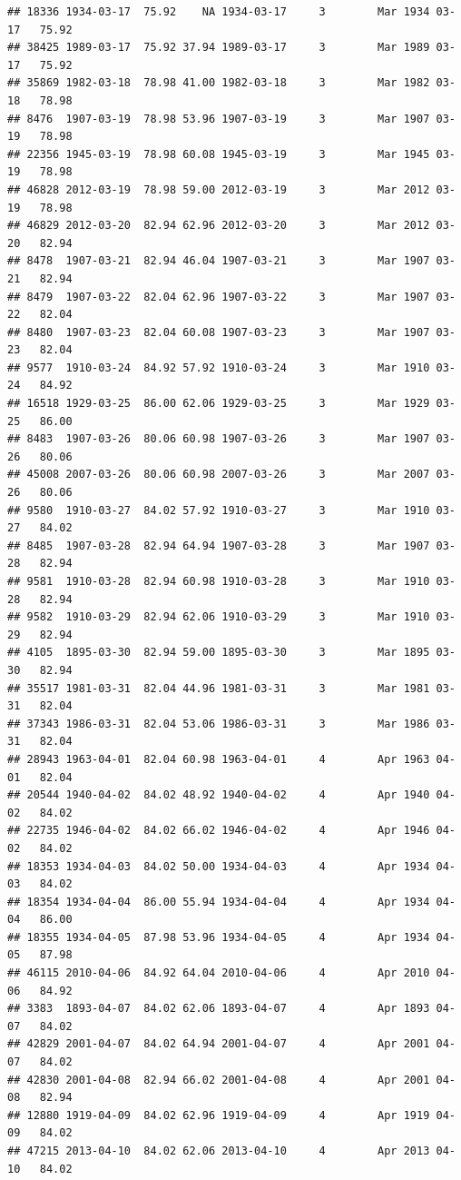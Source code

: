 \documentclass{article}\usepackage[]{graphicx}\usepackage[]{color}
\makeatletter
\newenvironment{kframe}{%
 \def\at@end@of@kframe{}%
 \ifinner\ifhmode%
  \def\at@end@of@kframe{\end{minipage}}%
  \begin{minipage}{\columnwidth}%
 \fi\fi%
 \def\FrameCommand##1{\hskip\@totalleftmargin \hskip-\fboxsep
 \colorbox{shadecolor}{##1}\hskip-\fboxsep
     \hskip-\linewidth \hskip-\@totalleftmargin \hskip\columnwidth}%
 \MakeFramed {\advance\hsize-\width
   \@totalleftmargin\z@ \linewidth\hsize
   \@setminipage}}%
 {\par\unskip\endMakeFramed%
 \at@end@of@kframe}
\newenvironment{knitrout}{}{} %
\makeatother
\begin{document}
\begin{knitrout}
\begin{kframe}
\begin{verbatim}
## 18336 1934-03-17  75.92    NA 1934-03-17     3        Mar 1934 03-17   75.92
## 38425 1989-03-17  75.92 37.94 1989-03-17     3        Mar 1989 03-17   75.92
## 35869 1982-03-18  78.98 41.00 1982-03-18     3        Mar 1982 03-18   78.98
## 8476  1907-03-19  78.98 53.96 1907-03-19     3        Mar 1907 03-19   78.98
## 22356 1945-03-19  78.98 60.08 1945-03-19     3        Mar 1945 03-19   78.98
## 46828 2012-03-19  78.98 59.00 2012-03-19     3        Mar 2012 03-19   78.98
## 46829 2012-03-20  82.94 62.96 2012-03-20     3        Mar 2012 03-20   82.94
## 8478  1907-03-21  82.94 46.04 1907-03-21     3        Mar 1907 03-21   82.94
## 8479  1907-03-22  82.04 62.96 1907-03-22     3        Mar 1907 03-22   82.04
## 8480  1907-03-23  82.04 60.08 1907-03-23     3        Mar 1907 03-23   82.04
## 9577  1910-03-24  84.92 57.92 1910-03-24     3        Mar 1910 03-24   84.92
## 16518 1929-03-25  86.00 62.06 1929-03-25     3        Mar 1929 03-25   86.00
## 8483  1907-03-26  80.06 60.98 1907-03-26     3        Mar 1907 03-26   80.06
## 45008 2007-03-26  80.06 60.98 2007-03-26     3        Mar 2007 03-26   80.06
## 9580  1910-03-27  84.02 57.92 1910-03-27     3        Mar 1910 03-27   84.02
## 8485  1907-03-28  82.94 64.94 1907-03-28     3        Mar 1907 03-28   82.94
## 9581  1910-03-28  82.94 60.98 1910-03-28     3        Mar 1910 03-28   82.94
## 9582  1910-03-29  82.94 62.06 1910-03-29     3        Mar 1910 03-29   82.94
## 4105  1895-03-30  82.94 59.00 1895-03-30     3        Mar 1895 03-30   82.94
## 35517 1981-03-31  82.04 44.96 1981-03-31     3        Mar 1981 03-31   82.04
## 37343 1986-03-31  82.04 53.06 1986-03-31     3        Mar 1986 03-31   82.04
## 28943 1963-04-01  82.04 60.98 1963-04-01     4        Apr 1963 04-01   82.04
## 20544 1940-04-02  84.02 48.92 1940-04-02     4        Apr 1940 04-02   84.02
## 22735 1946-04-02  84.02 66.02 1946-04-02     4        Apr 1946 04-02   84.02
## 18353 1934-04-03  84.02 50.00 1934-04-03     4        Apr 1934 04-03   84.02
## 18354 1934-04-04  86.00 55.94 1934-04-04     4        Apr 1934 04-04   86.00
## 18355 1934-04-05  87.98 53.96 1934-04-05     4        Apr 1934 04-05   87.98
## 46115 2010-04-06  84.92 64.04 2010-04-06     4        Apr 2010 04-06   84.92
## 3383  1893-04-07  84.02 62.06 1893-04-07     4        Apr 1893 04-07   84.02
## 42829 2001-04-07  84.02 64.94 2001-04-07     4        Apr 2001 04-07   84.02
## 42830 2001-04-08  82.94 66.02 2001-04-08     4        Apr 2001 04-08   82.94
## 12880 1919-04-09  84.02 62.96 1919-04-09     4        Apr 1919 04-09   84.02
## 47215 2013-04-10  84.02 62.06 2013-04-10     4        Apr 2013 04-10   84.02

\end{verbatim}
\end{kframe}
\end{knitrout}
\end{document}
